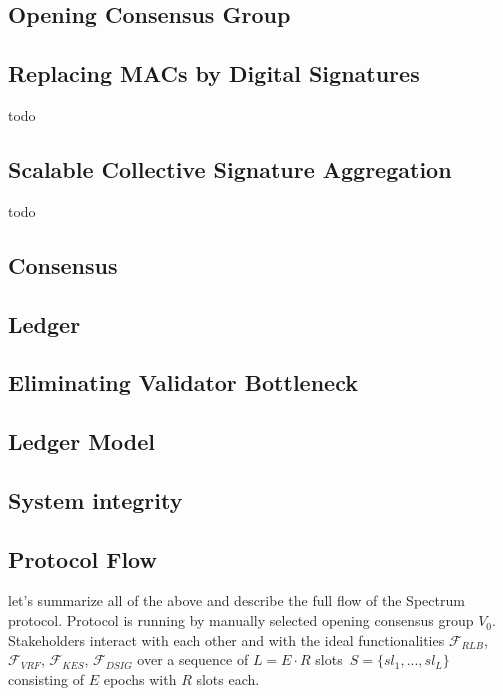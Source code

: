 \subsection{Opening Consensus Group}\label{subsec:opening-consensus-group-and-leaders}


\subsection{Replacing MACs by Digital Signatures}\label{subsec:replacing-macs-by-digital-signatures}

todo

\subsection{Scalable Collective Signature Aggregation}\label{subsec:scalable-collective-signature-aggregation}

todo

\subsection{Consensus}\label{subsec:consensus}


\subsection{Ledger}\label{subsec:ledger}


\subsection{Eliminating Validator Bottleneck}\label{subsec:eliminating-validator-bottleneck}


\subsection{Ledger Model}\label{subsec:ledger-model}


\subsection{System integrity}\label{subsec:system-integrity}


\subsection{Protocol Flow}\label{subsec:protocol-flow}
let's summarize all of the above and describe the full flow of the Spectrum protocol.
Protocol is running by manually selected opening consensus group $V_0$.
Stakeholders interact with each other and with the ideal functionalities ${\mathcal{F}}_{RLB}$,\
${\mathcal{F}}_{VRF}$, ${\mathcal{F}}_{KES}$, ${\mathcal{F}}_{DSIG}$ over a sequence of $L = E \cdot R$ slots\
${S=\{sl_1,...,sl_L\}}$ consisting of $E$ epochs with $R$ slots each.

